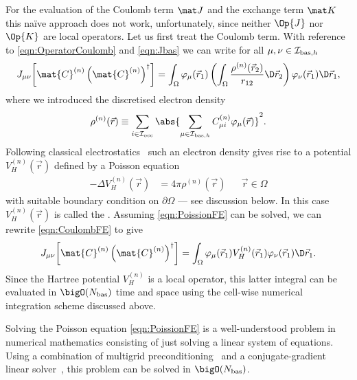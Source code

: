 For the evaluation of the Coulomb term $\matJ$
and the exchange term $\matK$ this na\"{i}ve approach does not work,
unfortunately, since neither $\Op{J}$ nor $\Op{K}$ are local operators.
Let us first treat the Coulomb term.
With reference to \eqref{eqn:OperatorCoulomb} and \eqref{eqn:Jbas}
we can write
for all $\mu, \nu \in \mathcal{I}_{\text{bas},h}$
\begin{equation}
	\label{eqn:CoulombFE}
	J_{\mu\nu}\!\left[\mat{C}^{(n)}
		\left(\mat{C}^{(n)}\right)^\dagger\right]
	= \int_\Omega \varphi_\mu(\vec{r}_1)
	\left(\int_\Omega \frac{\rho^{(n)}(\vec{r}_2)}
		{ r_{12} }\D \vec{r}_2 \right)
	\varphi_\nu(\vec{r}_1) \D \vec{r}_1,
\end{equation}
where we introduced the discretised electron density
\begin{equation}
	\rho^{(n)}(\vec{r}) \equiv \sum_{i\in\Iocc} \abs{\sum_{\mu\in\Ibash} C^{(n)}_{\mu i} \varphi_\mu(\vec{r})}^2.
	\label{eqn:ElectronDensityFE}
\end{equation}
Following classical electrostatics~\cite{Jackson1999}
such an electron density gives rise to a potential $V^{(n)}_H(\vec{r})$
defined by a Poisson equation
\begin{equation}
\label{eqn:PoissionFE}
\begin{aligned}
	-\Delta V^{(n)}_H(\vec{r}) &= 4\pi \rho^{(n)}(\vec{r}) &&\vec{r} \in \Omega
\end{aligned}
\end{equation}
with suitable boundary condition on $\partial\Omega$
--- see discussion below.
In this case $V^{(n)}_H(\vec{r})$ is called the .
Assuming \eqref{eqn:PoissionFE} can be solved,
we can rewrite \eqref{eqn:CoulombFE} to give
\[
	J_{\mu\nu}\!\left[\mat{C}^{(n)}\left(\mat{C}^{(n)}\right)^\dagger\right]
	= \int_\Omega \varphi_\mu(\vec{r}_1) V^{(n)}_H(\vec{r}_1) \varphi_\nu(\vec{r}_1) \D \vec{r}_1.
\]
Since the Hartree potential $V^{(n)}_H$ is a local operator,
this latter integral can be evaluated in $\bigO(\Nbas)$
time and space using the cell-wise numerical integration scheme discussed above.

Solving the Poisson equation \eqref{eqn:PoissionFE}
is a well-understood problem in numerical mathematics
consisting of just solving a linear system of equations.
Using a combination of multigrid preconditioning~\cite{Hackbusch1985}
and a conjugate-gradient linear solver~\cite{Grossmann1992},
this problem can be solved in $\bigO(\Nbas)$.%

